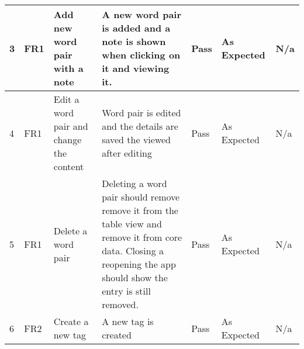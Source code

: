 \documentclass[paper=a4, fontsize=11pt]{scrartcl}	%
\numberwithin{equation}{section}															%
\numberwithin{figure}{section}																%
\numberwithin{table}{section}
\begin{document}
\begin{landscape}
\begin{longtable}{|l|p{2cm}|p{5cm}|p{5cm}|l|p{5cm}|p{5cm}|}
3  & FR1                    & Add new word pair with a note                        & A new word pair is added and a note is shown when clicking on it and viewing it.                                                                                                                                                           & Pass      & As Expected                                        & N/a                                                                                                                                                                                                                        \\ \hline
4  & FR1                    & Edit a word pair and change the content              & Word pair is edited and the details are saved the viewed after editing                                                                                                                                                                     & Pass      & As Expected                                        & N/a                                                                                                                                                                                                                        \\ \hline
5  & FR1                    & Delete a word pair                                   & Deleting a word pair should remove remove it from the table view and remove it from core data. Closing a reopening the app should show the entry is still removed.                                                                         & Pass      & As Expected                                        & N/a                                                                                                                                                                                                                        \\ \hline
6  & FR2                    & Create a new tag                                     & A new tag is created                                                                                                                                                                                                                       & Pass      & As Expected                                        & N/a                                                                                                                                                                                                                        \\ \hline

\end{longtable}
\end{landscape}
\end{document}
